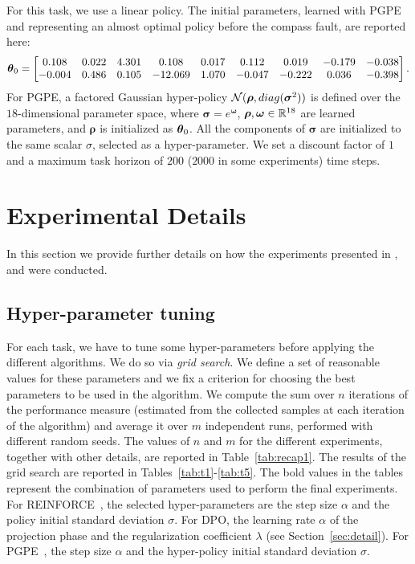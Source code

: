 For this task, we use a linear policy. The initial parameters, learned with \ac{PGPE} and representing an almost optimal policy before the compass fault, are reported here:
\[
\boldsymbol{\theta}_{0} = 
\begin{bmatrix}
0.108& 0.022& 4.301& 0.108& 0.017& 0.112& 0.019& -0.179& -0.038\\
-0.004& 0.486& 0.105& -12.069& 1.070& -0.047& -0.222& 0.036& -0.398\\
\end{bmatrix}.
\]
For \ac{PGPE}, a factored Gaussian hyper-policy $\mathcal{N}(\boldsymbol{\rho},\mathop{diag}(\boldsymbol{\sigma}^2))$ is defined over the $18$-dimensional parameter space, where $\boldsymbol{\sigma}=e^{\boldsymbol{\omega}}$, $\boldsymbol{\rho},\boldsymbol{\omega}\in\mathbb{R}^{18}$ are learned parameters, and $\boldsymbol{\rho}$ is initialized as $\boldsymbol{\theta}_{0}$. All the components of $\boldsymbol{\sigma}$ are initialized to the same scalar $\sigma$, selected as a hyper-parameter.
We set a discount factor of $1$ and a maximum task horizon of $200$ ($2000$ in some experiments) time steps.


\section{Experimental Details}\label{sec:exp2}

In this section we provide further details on how the experiments presented in ,  and  were conducted. 

\subsection{Hyper-parameter tuning}
For each task, we have to tune some hyper-parameters before applying the different algorithms. We do so via \emph{grid search}. We define a set of reasonable values for these parameters and we fix a criterion for choosing the best parameters to be used in the algorithm. We compute the sum over $n$ iterations of the performance measure (estimated from the collected samples at each iteration of the algorithm) and average it over $m$ independent runs, performed with different random seeds. 
The values of $n$ and $m$ for the different experiments, together with other details, are reported in Table~\ref{tab:recap1}.
The results of the grid search are reported in Tables~\ref{tab:t1}-\ref{tab:t5}.
The bold values in the tables represent the combination of parameters used to perform the final experiments. For REINFORCE~\citep{williams1992simple}, the selected hyper-parameters are the step size $\alpha$ and the policy initial standard deviation $\sigma$. For \ac{DPO}, the learning rate $\alpha$ of the projection phase and the regularization coefficient $\lambda$ (see Section~\ref{sec:detail}). For \ac{PGPE}~\citep{sehnke2008policy}, the step size $\alpha$ and the hyper-policy initial standard deviation $\sigma$.

